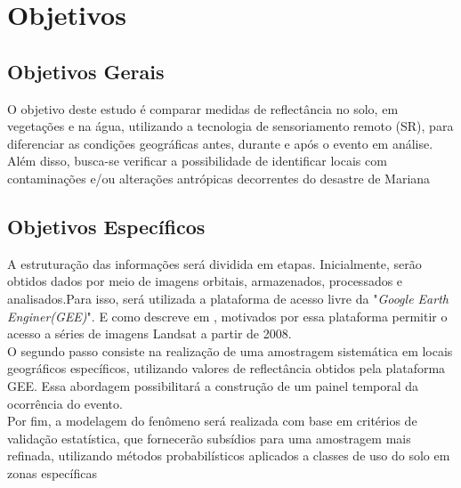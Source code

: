 
\section{ Objetivos}
%
\subsection{ Objetivos Gerais}
%
\hspace*{1.25 cm} O objetivo deste estudo é comparar medidas de reflectância no solo, em vegetações e na água, utilizando a tecnologia de sensoriamento remoto (SR), para diferenciar as condições geográficas antes, durante e após o evento em análise. Além disso, busca-se verificar a possibilidade de identificar locais com contaminações e/ou alterações antrópicas decorrentes do desastre de Mariana
\subsection{ Objetivos Específicos}

 \hspace*{1.25 cm} A estruturação das informações será dividida em etapas. Inicialmente, serão obtidos dados por meio de imagens orbitais, armazenados, processados e analisados.Para isso, será utilizada a plataforma de acesso livre da "\textit{Google Earth Enginer(GEE)}". E como descreve em \cite[p.1]{Mutanga}, motivados por essa plataforma permitir o acesso a séries de imagens Landsat a partir de 2008.\\
%
 \hspace*{1.25 cm} O segundo passo consiste na realização de uma amostragem sistemática em locais geográficos específicos, utilizando valores de reflectância obtidos pela plataforma GEE. Essa abordagem possibilitará a construção de um painel temporal da ocorrência do evento.\\
% 
 \hspace*{1.25 cm} Por fim, a modelagem do fenômeno será realizada com base em critérios de validação estatística, que fornecerão subsídios para uma amostragem mais refinada, utilizando métodos probabilísticos aplicados a classes de uso do solo em zonas específicas\\
% 
 
  

	
